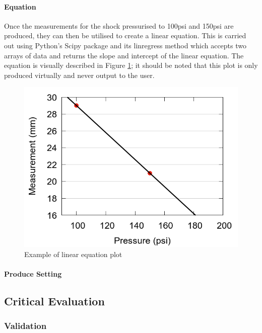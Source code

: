 		\paragraph{Equation}
			Once the measurements for the shock pressurised to 100psi and 150psi are produced, they can then be utilised to create a linear equation. This is carried out using Python's Scipy package and its linregress method which accepts two arrays of data and returns the slope and intercept of the linear equation. The equation is visually described in Figure \ref{fig:equation_plot}; it should be noted that this plot is only produced virtually and never output to the user.
			\begin{figure}[h!]
				\centering
				\includegraphics[scale=0.4]{../images/results/scatter_key.png}
				\caption{Example of linear equation plot}
				\label{fig:equation_plot}
			\end{figure}
		\paragraph{Produce Setting}
\clearpage
\subsection{Critical Evaluation}
	\subsubsection{Validation}
